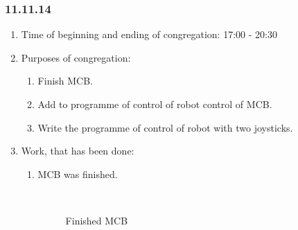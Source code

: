 
\subsubsection{11.11.14}

\begin{enumerate} 
	\item Time of beginning and ending of congregation:
	17:00 - 20:30
	\item Purposes of congregation:
	\begin{enumerate}
		\item Finish MCB.
		
		\item Add to programme of control of robot control of MCB.
		
		\item Write the programme of control of robot with two joysticks.
		
	\end{enumerate}
	
	\item Work, that has been done:
	\begin{enumerate}
		\item MCB was finished.
		
		\begin{figure}[H]
			\begin{minipage}[h]{0.47\linewidth}
			\end{minipage}
			\begin{minipage}[h]{0.47\linewidth}
			\end{minipage}
			\caption{Finished MCB}
		\end{figure}
		

\end{enumerate}
\end{enumerate}
